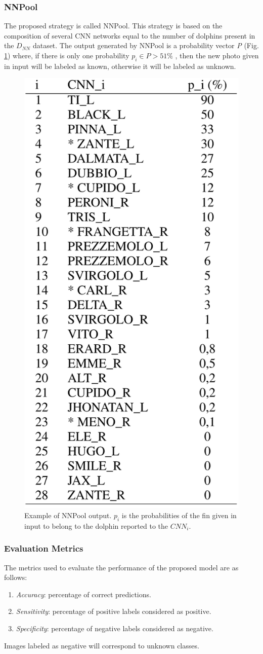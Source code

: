 \subsubsection{NNPool}
The proposed strategy is called NNPool. This strategy is based on the composition 
of several CNN networks equal to the number of dolphins present in 
the $D_{NN}$ dataset. The output generated by NNPool is a probability vector \emph{P} 
(Fig. \ref{fig:NNPool output}) where, if there is only one probability $p_i\in P > 51\%$ , then the new 
photo given in input will be labeled as known, otherwise it will be labeled as 
unknown.
\begin{figure}[h!]
    \centering
    \includegraphics[width = 0.4\linewidth]{images/paper10/NNPool output.png}
    \centering
    \caption{Example of NNPool output. $p_i$ is the probabilities of the fin given in input to belong to the dolphin reported to the $CNN_i$.}
    \label{fig:NNPool output}
\end{figure}

\subsubsection{Evaluation Metrics}
The metrics used to evaluate the performance of the proposed model are as follows:
\begin{enumerate}
    \item \emph{Accuracy}: percentage of correct predictions.
    \item \emph{Sensitivity}: percentage of positive labels considered as positive.
    \item \emph{Specificity}: percentage of negative labels considered as negative.
\end{enumerate}
Images labeled as negative will correspond to unknown classes.


